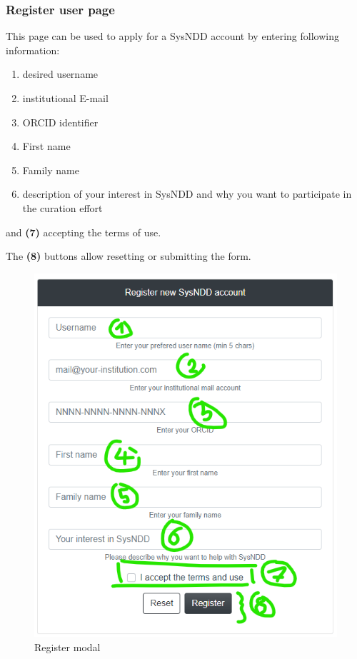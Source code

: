 \documentclass[
]{article}
\providecommand{\tightlist}{%
  \setlength{\itemsep}{0pt}\setlength{\parskip}{0pt}}
\begin{document}
\hypertarget{register-user-page}{%
\subsubsection{Register user page}\label{register-user-page}}

This page can be used to apply for a SysNDD account by entering following information:

\begin{enumerate}
\def\labelenumi{\arabic{enumi})}
\tightlist
\item
  desired username
\item
  institutional E-mail
\item
  ORCID identifier
\item
  First name
\item
  Family name
\item
  description of your interest in SysNDD and why you want to participate in the curation effort
\end{enumerate}

and \textbf{(7)} accepting the terms of use.

The \textbf{(8)} buttons allow resetting or submitting the form.

\begin{figure}
\centering
\includegraphics{./static/img/02_17-register-modal.png}
\caption{Register modal}
\end{figure}
\end{document}

